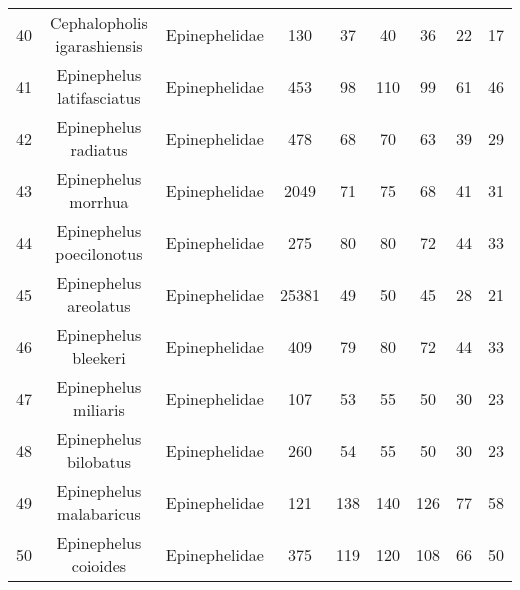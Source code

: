 {\begin{longtable}{ccccccccc}
  40 & Cephalopholis igarashiensis & Epinephelidae & 130 & 37 & 40 & 36 & 22 & 17 \\ 
  41 & Epinephelus latifasciatus & Epinephelidae & 453 & 98 & 110 & 99 & 61 & 46 \\ 
  42 & Epinephelus radiatus & Epinephelidae & 478 & 68 & 70 & 63 & 39 & 29 \\ 
  43 & Epinephelus morrhua & Epinephelidae & 2049 & 71 & 75 & 68 & 41 & 31 \\ 
  44 & Epinephelus poecilonotus & Epinephelidae & 275 & 80 & 80 & 72 & 44 & 33 \\ 
  45 & Epinephelus areolatus & Epinephelidae & 25381 & 49 & 50 & 45 & 28 & 21 \\ 
  46 & Epinephelus bleekeri & Epinephelidae & 409 & 79 & 80 & 72 & 44 & 33 \\ 
  47 & Epinephelus miliaris & Epinephelidae & 107 & 53 & 55 & 50 & 30 & 23 \\ 
  48 & Epinephelus bilobatus & Epinephelidae & 260 & 54 & 55 & 50 & 30 & 23 \\ 
  49 & Epinephelus malabaricus & Epinephelidae & 121 & 138 & 140 & 126 & 77 & 58 \\ 
  50 & Epinephelus coioides & Epinephelidae & 375 & 119 & 120 & 108 & 66 & 50 \\ 
   \hline
\hline
\end{longtable}
}
 
